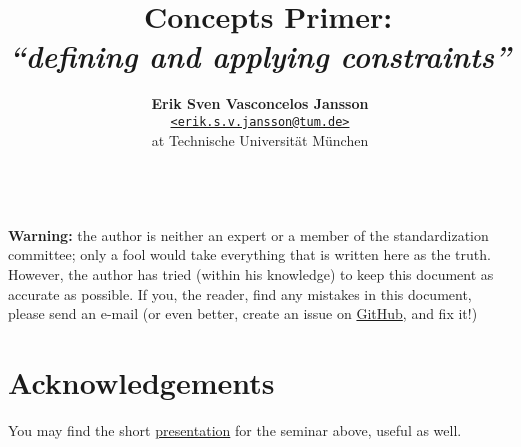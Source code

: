 \documentclass[a4paper, 11pt]{article}
\title{\vspace{-1.5em}\textbf{\Cpp\ Concepts Primer:}\\
       \large{\emph{``defining and applying constraints''}}}
\author{{\textbf{Erik Sven Vasconcelos Jansson}} \\
        {\href{mailto:erik.s.v.jansson@tum.de}
        {\texttt{<erik.s.v.jansson@tum.de>}}} \\
        {at Technische Universität München}}
\begin{document}
    \maketitle \begin{spacing}{0.94} \tableofcontents \end{spacing}

    \mbox{} \\ \noindent \textbf{Warning:} the author is neither an expert or a member of the standardization committee; only a fool would take everything that is written here as the truth. However, the author has tried (within his knowledge) to keep this document as accurate as possible. If you, the reader, find any mistakes in this document, please send an e-mail (or even better, create an issue on \href{https://github.com/CaffeineViking/concepts-primer}{GitHub}, and fix it!) \mbox{}  \thispagestyle{empty} \newpage {}

     \newpage
     \newpage
     \newpage
     \newpage
    \label{sec:standard_library_concepts}  \newpage
    \label{sec:summary}  \newpage

    \nocite{*} %
    
    

    \section*{Acknowledgements} \label{sec:acknowledgements} 

    You may find the short \href{https://github.com/CaffeineViking/concepts-primer/raw/master/slides/slides.pdf}{presentation} for the seminar above, useful as well.
\end{document}

